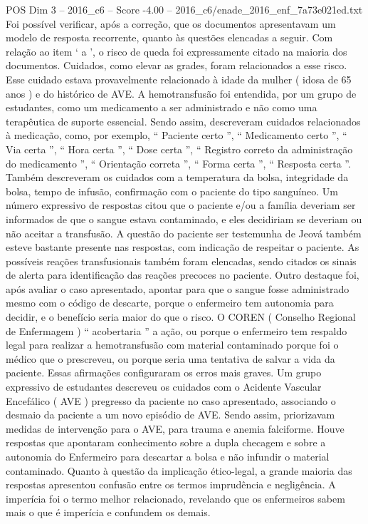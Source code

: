 \begin{textsample}{POS Dim 3 – 2016\_c6 – Score -4.00 – 2016\_c6/enade\_2016\_enf\_7a73e021ed.txt}
Foi possível verificar, após a correção, que os documentos apresentavam um modelo de resposta recorrente, quanto às questões elencadas a seguir.
Com relação ao item ‘ a ’, o risco de queda foi expressamente citado na maioria dos documentos.
Cuidados, como elevar as grades, foram relacionados a esse risco.
Esse cuidado estava provavelmente relacionado à idade da mulher ( idosa de 65 anos ) e do histórico de AVE.
A hemotransfusão foi entendida, por um grupo de estudantes, como um medicamento a ser administrado e não como uma terapêutica de suporte essencial.
Sendo assim, descreveram cuidados relacionados à medicação, como, por exemplo, “ Paciente certo ”, “ Medicamento certo ”, “ Via certa ”, “ Hora certa ”, “ Dose certa ”, “ Registro correto da administração do medicamento ”, “ Orientação correta ”, “ Forma certa ”, “ Resposta certa ”.
Também descreveram os cuidados com a temperatura da bolsa, integridade da bolsa, tempo de infusão, confirmação com o paciente do tipo sanguíneo.
Um número expressivo de respostas citou que o paciente e/ou a família deveriam ser informados de que o sangue estava contaminado, e eles decidiriam se deveriam ou não aceitar a transfusão.
A questão do paciente ser testemunha de Jeová também esteve bastante presente nas respostas, com indicação de respeitar o paciente.
As possíveis reações transfusionais também foram elencadas, sendo citados os sinais de alerta para identificação das reações precoces no paciente.
Outro destaque foi, após avaliar o caso apresentado, apontar para que o sangue fosse administrado mesmo com o código de descarte, porque o enfermeiro tem autonomia para decidir, e o benefício seria maior do que o risco.
O COREN ( Conselho Regional de Enfermagem ) “ acobertaria ” a ação, ou porque o enfermeiro tem respaldo legal para realizar a hemotransfusão com material contaminado porque foi o médico que o prescreveu, ou porque seria uma tentativa de salvar a vida da paciente.
Essas afirmações configuraram os erros mais graves.
Um grupo expressivo de estudantes descreveu os cuidados com o Acidente Vascular Encefálico ( AVE ) pregresso da paciente no caso apresentado, associando o desmaio da paciente a um novo episódio de AVE.
Sendo assim, priorizavam medidas de intervenção para o AVE, para trauma e anemia falciforme.
Houve respostas que apontaram conhecimento sobre a dupla checagem e sobre a autonomia do Enfermeiro para descartar a bolsa e não infundir o material contaminado.
Quanto à questão da implicação ético-legal, a grande maioria das respostas apresentou confusão entre os termos imprudência e negligência.
A imperícia foi o termo melhor relacionado, revelando que os enfermeiros sabem mais o que é imperícia e confundem os demais.

\end{textsample}
